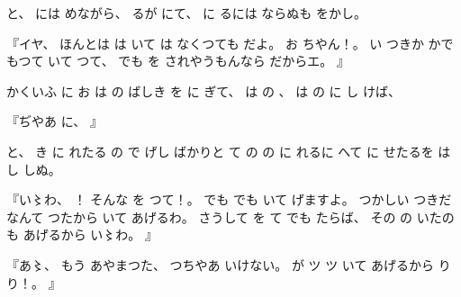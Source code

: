 %
と、
%
には
めながら、
%
るが
にて、
%
に
るには
ならぬも
をかし。

%
『イヤ、
%
ほんとは
は
いて
は
なくつても
だよ。
%
お
ちやん！。
%
い
つきか
かで
もつて
いて
つて、
%
でも
を
されやうもんなら
だからエ。
』

%
かくいふ
に
お
は
の
ばしき
を
に
ぎて、
%
は%
の
、
%
は%
の%
に
し
けば、

%
『ぢやあ
に、
』

%
と、
%
き
に
れたる
の
で
げし
ばかりと
て
の
の%
に
れるに
へて
に
せたるを
は
し
しぬ。

%
『い〻わ、%
%
！\inhibitglue{}%
そんな
を
つて！。
%
でも
でも
いて
げますよ。
%
つかしい
つきだなんて
つたから
いて
あげるわ。
%
さうして
を
て
でも
たらば、
%
その
の
いたのも
あげるから
い〻わ。%
』

%
『あ〻、%
%
もう
あやまつた、
%
つちやあ
いけない。
%
が
ツ
ツ
いて
あげるから
り
り！。
』

